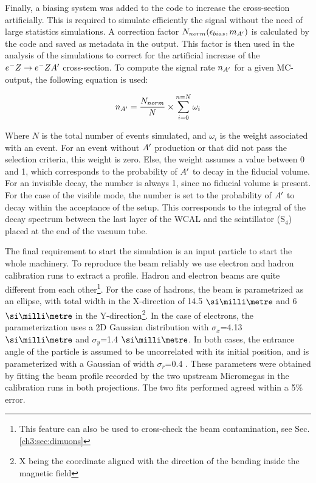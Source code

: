 Finally, a biasing system was added to the code to increase the cross-section artificially. This is required to simulate efficiently the signal without the need of large statistics simulations. A correction factor $N_{norm}(\epsilon_{bias},m_{A'})$ is calculated by the code and saved as metadata in the output. This factor is then used in the analysis of the simulations to correct for the artificial increase of the $e^- Z \to e^- Z A'$ cross-section. To compute the signal rate $n_{A'}$ for a given MC-output, the following equation is used:

\begin{equation}
  \label{eq:1}
  n_{A'} = \frac{N_{norm}}{N} \times \sum^{n=N}_{i=0} \omega_i
\end{equation}

Where $N$ is the total number of events simulated, and $\omega_i$ is the weight associated with an event. For an event without $A'$ production or that did not pass the selection criteria, this weight is zero. Else, the weight assumes a value between 0 and 1, which corresponds to the probability of $A'$ to decay in the fiducial volume. For an invisible decay, the number is always 1, since no fiducial volume is present. For the case of the visible mode, the number is set to the probability of $A'$ to decay within the acceptance of the setup. This corresponds to the integral of the decay spectrum between the last layer of the WCAL and the scintillator (S$_4$) placed at the end of the vacuum tube.

The final requirement to start the simulation is an input particle to start the whole machinery. 
To reproduce the beam reliably we use electron and hadron calibration runs to extract a profile. Hadron and electron beams are quite different from each other\footnote{This feature can also be used to cross-check the beam contamination, see Sec.\ref{ch3:sec:dimuons}}. For the case of hadrons, the beam is parametrized as an ellipse, with total width in the X-direction of 14.5 $\mmi$ and 6 $\mmi$ in the Y-direction\footnote{X being the coordinate aligned with the direction of the bending inside the magnetic field}. In the case of electrons, the parameterization uses a 2D Gaussian distribution with $\sigma_x$=4.13 $\mmi$ and $\sigma_y$=1.4 $\mmi$. In both cases, the entrance angle of the particle is assumed to be uncorrelated with its initial position, and is parameterized with a Gaussian of width $\sigma_r$=0.4 \mrad. These parameters were obtained by fitting the beam profile recorded by the two upstream Micromegas in the calibration runs in both projections. The two fits performed agreed within a 5\% error.

